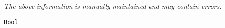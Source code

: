 \label{pkg:bool}

{\tiny \it The above information is manually maintained and may contain errors.}
\begin{verbatim}
Bool
\end{verbatim}

